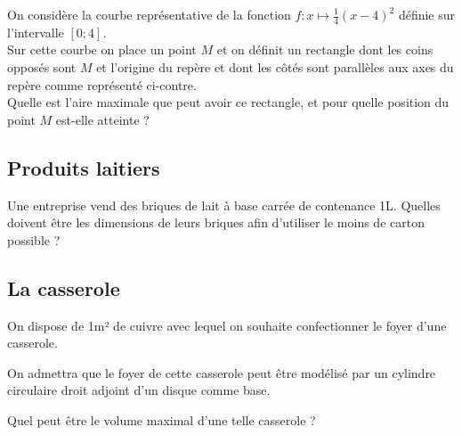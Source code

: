 \documentclass[oneside,12pt]{book}          %
\begin{document}
\begin{minipage}{0.5\linewidth}
On considère la courbe représentative de la fonction $f:x\mapsto\frac{1}{4}(x-4)^2$ définie sur l'intervalle $[0;4]$.\\

Sur cette courbe on place un point $M$ et on définit un rectangle dont les coins opposés sont $M$ et l'origine du repère et dont les côtés sont parallèles aux axes du repère comme représenté ci-contre.\\

Quelle est l'aire maximale que peut avoir ce rectangle, et pour quelle position du point $M$ est-elle atteinte ?
\end{minipage}
\begin{minipage}{0.5\linewidth}
\end{minipage}



\subsection{Produits laitiers}
Une entreprise vend des briques de lait à base carrée de contenance 1L. Quelles doivent être les dimensions de leurs briques afin d'utiliser le moins de carton possible ?



\subsection{La casserole}
On dispose de 1m² de cuivre avec lequel on souhaite confectionner le foyer d'une casserole.

On admettra que le foyer de cette casserole peut être modélisé par un cylindre circulaire droit adjoint d'un disque comme base.

Quel peut être le volume maximal d'une telle casserole ?
\end{document}
